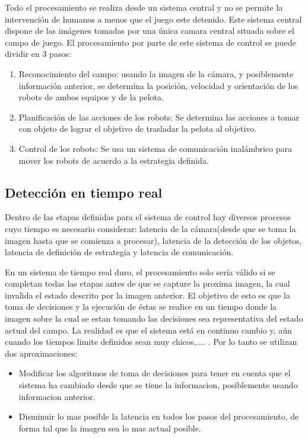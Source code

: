 \documentclass[a4paper,10pt]{report}
\begin{document}
Todo el procesamiento se realiza desde un sistema central y no se permite la intervención de humanos a menos que el juego este detenido.
Este sistema central dispone de las imágenes tomadas por una única camara central situada sobre el campo de juego.
El procesamiento por parte de este sistema de control se puede dividir en 3 pasos:
\begin{enumerate}
 \item Reconocimiento del campo: usando la imagen de la cámara, y posiblemente información anterior, se determina la posición, velocidad y orientación de los robots de ambos equipos y de la pelota.
 \item Planificación de las acciones de los robots: Se determina las acciones a tomar con objeto de lograr el objetivo de trasladar la pelota al objetivo.
 \item Control de los robots: Se usa un sistema de comunicación inalámbrico para mover los robots de acuerdo a la estrategia definida.
\end{enumerate}






\subsection{Detección en tiempo real}
Dentro de las etapas definidas para el sistema de control hay diversos procesos cuyo tiempo es necesario considerar: latencia de la cámara(desde que se toma la imagen hasta que se comienza a procesar),
latencia de la detección de los objetos, latencia de definición de estrategia y latencia de comunicación.

En un sistema de tiempo real duro, el procesamiento solo sería válido si se completan todas las etapas antes de que se capture la proxima imagen, la cual invalida el estado descrito por la imagen anterior.
El objetivo de esto es que la toma de decisiones y la ejecución de éstas se realice en un tiempo donde la imagen sobre la cual se estan tomando las decisiones sea representativa del estado actual del campo.
La realidad es que el sistema está en continuo cambio y, aún cuando los tiempos limite definidos sean muy chicos,....   . Por lo tanto se utilizan dos aproximaciones: 
\begin{itemize}
 \item Modificar los algoritmos de toma de decisiones para tener en cuenta que el sistema ha cambiado desde que se tiene la informacion, posiblemente usando informacion anterior.
 \item Disminuir lo mas posible la latencia en todos los pasos del procesamiento, de forma tal que la imagen sea lo mas actual posible.

 \end{itemize}
\end{document}
